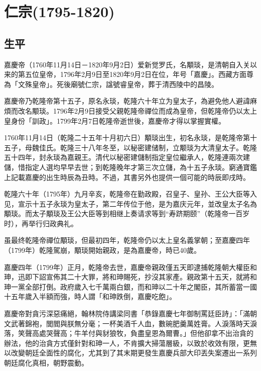 
\section{仁宗\tiny(1795-1820)}

\subsection{生平}

嘉慶帝（1760年11月14日－1820年9月2日）爱新觉罗氏，名顒琰，是清朝自入关以来的第五位皇帝，1796年2月9日至1820年9月2日在位，年号「嘉慶」。西藏方面尊為「文殊皇帝」。死後廟號仁宗，諡號睿皇帝，葬于清西陵中的昌陵。

嘉慶帝乃乾隆帝第十五子，原名永琰，乾隆六十年立为皇太子，為避免他人避諱麻煩而改名颙琰。1796年2月9日接受父親乾隆帝禪位而成為皇帝，但乾隆帝仍以太上皇身份「訓政」。1799年2月7日乾隆帝逝世後，嘉慶帝才得以掌握實權。

1760年11月14日（乾隆二十五年十月初六日）顒琰出生，初名永琰，是乾隆帝第十五子，母魏佳氏。乾隆三十八年冬至，以秘密建储制，立颙琰为大清皇太子。乾隆五十四年，封永琰為嘉親王。清代以秘密建儲制指定皇位繼承人，乾隆連兩次建儲，惜指定人選均早早去世；到乾隆晚年才第三次立儲，為十五子永琰。窮通寶鑑上記載嘉慶的出生時辰為丑時。不過，其書另外也提供一個可能的時辰即戌時。

乾隆六十年（1795年）九月辛亥，乾隆帝在勤政殿，召皇子、皇孙、王公大臣等入见，宣示十五子永琰为皇太子，第二年传位于他，是为嘉庆元年，並改皇太子名為顒琰。而太子顒琰及王公大臣等到相继上奏请求等到“寿跻期颐”（乾隆帝一百岁时），再举行归政典礼。

虽最终乾隆帝禪位顒琰，但最初四年，乾隆帝仍以太上皇名義掌朝；至嘉慶四年（1799年）乾隆駕崩，顒琰開始親政，是為嘉慶帝，時已40歲。

嘉慶四年（1799年）正月，乾隆帝去世，嘉慶帝親政僅五天即逮捕乾隆朝大權臣和珅，迅即下詔宣佈其二十大罪，將和珅賜死，抄沒其家產。親政第十五天，就將和珅一黨全部打倒。政府歲入七千萬兩白銀，而和珅以二十年之閣臣，其所蓄當一國十五年歲入半額而強，時人謂「和珅跌倒，嘉慶吃飽」。

嘉慶帝對貪污深惡痛絕，翰林院侍講梁同書「恭錄嘉慶七年御制罵廷臣詩」：「滿朝文武著錦袍，閭閻與朕無分毫；一杯美酒千人血，數碗肥羹萬姓膏。人淚落時天淚落，笑聲高處哭聲高；牛羊付與豺狼牧，負盡皇恩為爾曹。」但他卻拿不出治貪的辦法，他的治貪方式僅針對和珅一人，不肯擴大掃蕩層級，以致於收效有限，更無以改變朝廷全面性的腐化，尤其到了其末期更發生嘉慶兵部大印丟失案遷出一系列朝廷腐化真相，朝野震動。


